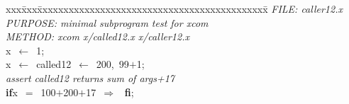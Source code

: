 \documentclass{report}
\begin{document}
\pagestyle{empty}
\begin{tabbing}
xxx\=xxx\=xxxxxxxxxxxxxxxxxxxxxxxxxxxxxxxxxxxxxxxxxxxx\=\kill
{\tt{}}{\em{} FILE:    caller12.x
}\\
{\tt{}}{\em{} PURPOSE: minimal subprogram test for xcom
}\\
{\tt{}}{\em{} METHOD:  xcom x/called12.x x/caller12.x
}\\
x\ $\leftarrow$\ 1;\\
x\ $\leftarrow$\ called12\ $\leftarrow$\ 200,\ 99$+$1;\\
{\tt{}}{\em{} assert called12 returns sum of args+17
}\\
{\bf if}\>x\ $=$\ 100$+$200$+$17\ $\Rightarrow$
\ {\bf {f}{i}};
\\
\end{tabbing}
\end{document}
